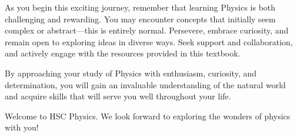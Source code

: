 As you begin this exciting journey, remember that learning Physics is both challenging and rewarding. You may encounter concepts that initially seem complex or abstract—this is entirely normal. Persevere, embrace curiosity, and remain open to exploring ideas in diverse ways. Seek support and collaboration, and actively engage with the resources provided in this textbook.

By approaching your study of Physics with enthusiasm, curiosity, and determination, you will gain an invaluable understanding of the natural world and acquire skills that will serve you well throughout your life.

Welcome to HSC Physics. We look forward to exploring the wonders of physics with you!

